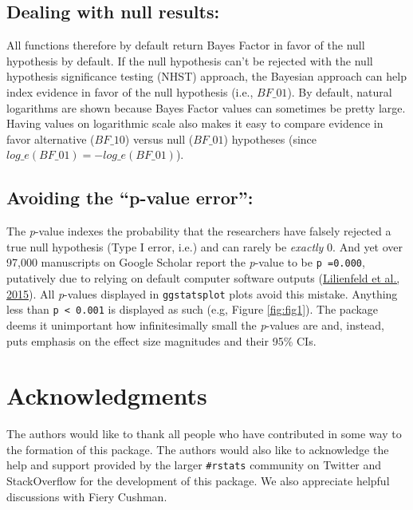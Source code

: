\documentclass[
]{article}
\begin{document}
\hypertarget{dealing-with-null-results}{%
\subsection{\texorpdfstring{Dealing with \textbf{null results}:}{Dealing with null results:}}\label{dealing-with-null-results}}

All functions therefore by default return Bayes Factor
in favor of the null hypothesis by default. If the null hypothesis can't be
rejected with the null hypothesis significance testing (NHST) approach, the
Bayesian approach can help index evidence in favor of the null hypothesis (i.e.,
\(BF\_{01}\)). By default, natural logarithms are shown because Bayes Factor
values can sometimes be pretty large. Having values on logarithmic scale also
makes it easy to compare evidence in favor alternative (\(BF\_{10}\)) versus null
(\(BF\_{01}\)) hypotheses (since \(log\_{e}(BF\_{01}) = - log\_{e}(BF\_{01})\)).

\hypertarget{avoiding-the-p-value-error}{%
\subsection{\texorpdfstring{Avoiding the \textbf{``p-value error''}:}{Avoiding the ``p-value error'':}}\label{avoiding-the-p-value-error}}

The \emph{p}-value indexes the probability that the researchers have falsely rejected
a true null hypothesis (Type I error, i.e.) and can rarely be \emph{exactly} 0. And
yet over 97,000 manuscripts on Google Scholar report the \emph{p}-value to be \texttt{p\ =0.000},
putatively due to relying on default computer software outputs
(\protect\hyperlink{ref-lilienfeldFiftyPsychologicalPsychiatric2015}{Lilienfeld et al., 2015}). All \emph{p}-values displayed in
\texttt{ggstatsplot} plots avoid this mistake. Anything less than \texttt{p\ \textless{}\ 0.001} is
displayed as such (e.g, Figure \ref{fig:fig1}). The package deems it unimportant how
infinitesimally small the \emph{p}-values are and, instead, puts emphasis on the
effect size magnitudes and their 95\% CIs.

\newpage

\hypertarget{acknowledgments}{%
\section{Acknowledgments}\label{acknowledgments}}

The authors would like to thank all people who have contributed in some way to
the formation of this package. The authors would also like to acknowledge the
help and support provided by the larger \texttt{\#rstats} community on Twitter and
StackOverflow for the development of this package. We also appreciate helpful
discussions with Fiery Cushman.
\end{document}
